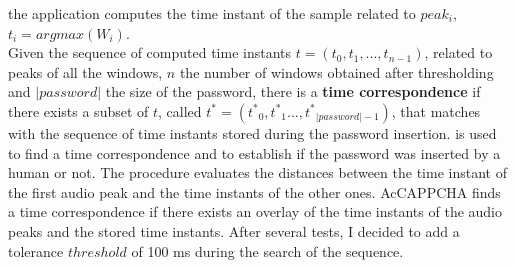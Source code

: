 the application computes the time instant of the sample related to $peak_i$, $t_i= argmax(W_i)$.\\
Given the sequence of computed time instants $t=(t_0, t_1, ..., t_{n-1})$, related to peaks of all the windows, $n$ the number of windows obtained after thresholding and $|password|$ the size of the password, there is a \textbf{time correspondence} if there exists a subset of $t$, called $t^{*}=({t^*}_0, {t^*}_1..., {t^*}_{|password|-1})$, that matches with the sequence of time instants stored during the password insertion.  is used to find a time correspondence and to establish if the password was inserted by a human or not. The procedure evaluates the distances between the time instant of the first audio peak and the time instants of the other ones. AcCAPPCHA finds a time correspondence if there exists an overlay of the time instants of the audio peaks and the stored time instants. After several tests, I decided to add a tolerance $threshold$ of 100 ms during the search of the sequence.

